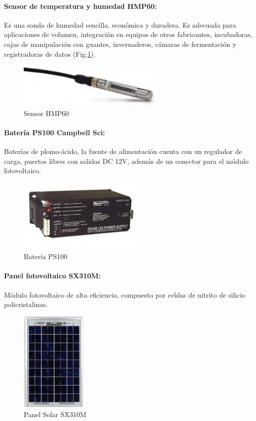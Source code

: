 \paragraph{Sensor de temperatura y humedad HMP60:}
Es una sonda de humedad sencilla, económica y duradera. Es adecuada para aplicaciones de volumen, integración en equipos de otros fabricantes, incubadoras, cajas de manipulación con guantes, invernaderos, cámaras de fermentación y registradoras de datos (Fig:\ref{hr}).

\begin{figure}[h!]
        \centering
        \includegraphics[width=200pt]{images/SensorThmp60}
        \caption{Sensor HMP60}
	\label{hr}
\end{figure}

\paragraph{Batería PS100 Campbell Sci:}
Baterías de plomo-ácido, la fuente de alimentación cuenta con un regulador de carga, puertos libres con salidas DC 12V, además de un conector para el módulo fotovoltaico.

\newpage
\begin{figure}[h!]
        \centering
        \includegraphics[width=170pt]{images/bateria}
        \caption{Batería PS100} 
\end{figure}

\paragraph{Panel fotovoltaico SX310M:}
Módulo fotovoltaico de alta eficiencia, compuesto por celdas de nitrito de silicio policristalinas.

\begin{figure}[h!]
        \centering
        \includegraphics[width=90pt]{images/panelSolar}
        \caption{Panel Solar SX310M} 
\end{figure}


